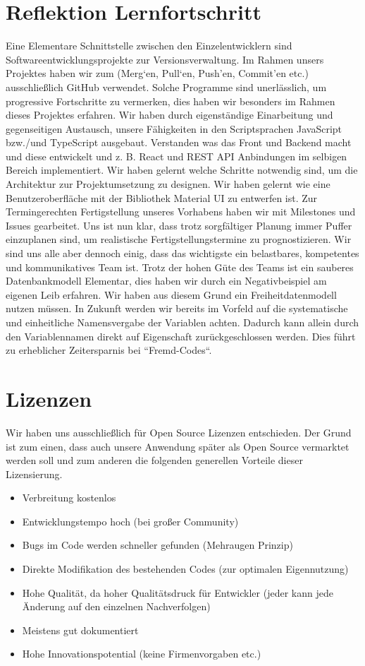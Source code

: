 \section{Reflektion Lernfortschritt}
Eine Elementare Schnittstelle zwischen den Einzelentwicklern sind Softwareentwicklungsprojekte zur Versionsverwaltung. 
Im Rahmen unsers Projektes haben wir zum (Merg‘en, Pull‘en, Push’en, Commit’en etc.) ausschließlich GitHub verwendet. 
Solche Programme sind unerlässlich, um progressive Fortschritte zu vermerken, dies haben wir besonders im Rahmen dieses Projektes erfahren. 
Wir haben durch eigenständige Einarbeitung und gegenseitigen Austausch, unsere Fähigkeiten in den Scriptsprachen JavaScript bzw./und TypeScript ausgebaut. 
Verstanden was das Front und Backend macht und diese entwickelt und z. B. React und REST API Anbindungen im selbigen Bereich implementiert. 
Wir haben gelernt welche Schritte notwendig sind, um die Architektur zur Projektumsetzung zu designen. 
Wir haben gelernt wie eine Benutzeroberfläche mit der Bibliothek Material UI zu entwerfen ist. 
Zur Termingerechten Fertigstellung unseres Vorhabens haben wir mit Milestones und Issues gearbeitet. 
Uns ist nun klar, dass trotz sorgfältiger Planung immer Puffer einzuplanen sind, um realistische Fertigstellungstermine zu prognostizieren. 
Wir sind uns alle aber dennoch einig, dass das wichtigste ein belastbares, kompetentes und kommunikatives Team ist. 
Trotz der hohen Güte des Teams ist ein sauberes Datenbankmodell Elementar, dies haben wir durch ein Negativbeispiel am eigenen Leib erfahren.
Wir haben aus diesem Grund ein Freiheitdatenmodell nutzen müssen. 
In Zukunft werden wir bereits im Vorfeld auf die systematische und einheitliche Namensvergabe der Variablen achten. 
Dadurch kann allein durch den Variablennamen direkt auf Eigenschaft zurückgeschlossen werden.
Dies führt zu erheblicher Zeitersparnis bei “Fremd-Codes“.


\section{Lizenzen}
Wir haben uns ausschließlich für Open Source Lizenzen entschieden. 
Der Grund ist zum einen, dass auch unsere Anwendung später als Open Source vermarktet werden soll und zum anderen die folgenden generellen Vorteile dieser Lizensierung.

\begin{itemize}
    \item	Verbreitung kostenlos
    \item   Entwicklungstempo hoch (bei großer Community)
    \item   Bugs im Code werden schneller gefunden (Mehraugen Prinzip)
    \item	Direkte Modifikation des bestehenden Codes (zur optimalen Eigennutzung)
    \item	Hohe Qualität, da hoher Qualitätsdruck für Entwickler (jeder kann jede Änderung auf den einzelnen Nachverfolgen)
    \item	Meistens gut dokumentiert
    \item	Hohe Innovationspotential (keine Firmenvorgaben etc.)
\end{itemize}

